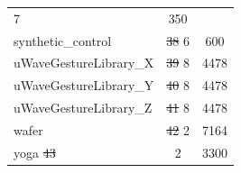 \documentclass[natbib,smallextended]{svjour3}
\providecommand{\DIFdeltex}[1]{{\protect\color{red}\sout{#1}}}                      %
\providecommand{\DIFdelFL}[1]{\DIFdel{#1}} %
\providecommand{\DIFdelbeginFL}{} %
\providecommand{\DIFdelendFL}{} %
\providecommand{\DIFdel}[1]{\texorpdfstring{\DIFdeltex{#1}}{}} %
\newcommand{\DIFscaledelfig}{0.5}
\newlength{\DIFdelgraphicswidth} %
\newlength{\DIFdelgraphicsheight} %
\newcommand{\DIFdelincludegraphics}[2][]{%
\sbox{\DIFdelgraphicsbox}{\DIFOincludegraphics[#1]{#2}}%
\settoboxwidth{\DIFdelgraphicswidth}{\DIFdelgraphicsbox} %
\settoboxtotalheight{\DIFdelgraphicsheight}{\DIFdelgraphicsbox} %
\scalebox{\DIFscaledelfig}{%
\parbox[b]{\DIFdelgraphicswidth}{\usebox{\DIFdelgraphicsbox}\\[-\baselineskip] \rule{\DIFdelgraphicswidth}{0em}}\llap{\resizebox{\DIFdelgraphicswidth}{\DIFdelgraphicsheight}{%
\setlength{\unitlength}{\DIFdelgraphicswidth}%
\begin{picture}(1,1)%
\thicklines\linethickness{2pt} %
{\color[rgb]{1,0,0}\put(0,0){\framebox(1,1){}}}%
{\color[rgb]{1,0,0}\put(0,0){\line( 1,1){1}}}%
{\color[rgb]{1,0,0}\put(0,1){\line(1,-1){1}}}%
\end{picture}%
}\hspace*{3pt}}} %
} %
\DeclareRobustCommand{\DIFdelbeginFL}{\DIFOdelbeginFL \let\includegraphics\DIFdelincludegraphics} %
\DeclareRobustCommand{\DIFdelendFL}{\DIFOaddendFL \let\includegraphics\DIFOincludegraphics} %
\begin{document}
\begin{table} [h!]
\begin{center}
\begin{tabular}{lcc}
\DIFdelendFL 7 &  350 \\
synthetic\_control  &  \DIFdelbeginFL \DIFdelFL{38 }%
\DIFdelendFL 6 &  600 \\
uWaveGestureLibrary\_X  &  \DIFdelbeginFL \DIFdelFL{39 }%
\DIFdelendFL 8 & 4478 \\
uWaveGestureLibrary\_Y  &  \DIFdelbeginFL \DIFdelFL{40 }%
\DIFdelendFL 8 & 4478 \\
uWaveGestureLibrary\_Z  &  \DIFdelbeginFL \DIFdelFL{41 }%
\DIFdelendFL 8 & 4478 \\
wafer  &  \DIFdelbeginFL \DIFdelFL{42 }%
\DIFdelendFL 2 & 7164 \\
yoga  \DIFdelbeginFL %
\DIFdelFL{43 }\DIFdelendFL &  2 & 3300 \\
\end{tabular}
\end{center}
\end{table}
\end{document}
